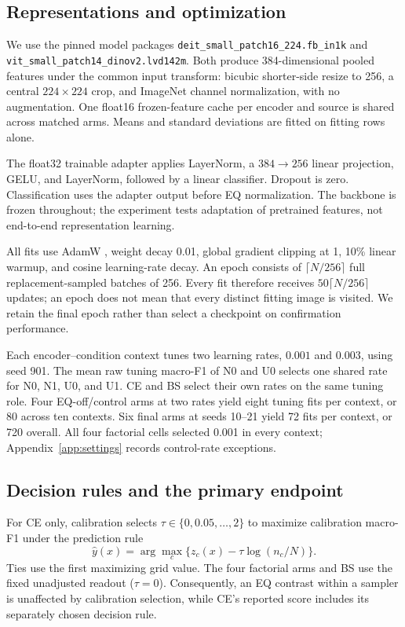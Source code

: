\documentclass[conference]{IEEEtran}
\begin{document}
\subsection{Representations and optimization}
We use the pinned model packages \nolinkurl{deit_small_patch16_224.fb_in1k} and \nolinkurl{vit_small_patch14_dinov2.lvd142m}. Both produce 384-dimensional pooled features under the common input transform: bicubic shorter-side resize to 256, a central $224\times224$ crop, and ImageNet channel normalization, with no augmentation. One float16 frozen-feature cache per encoder and source is shared across matched arms. Means and standard deviations are fitted on fitting rows alone.

The float32 trainable adapter applies LayerNorm, a $384\rightarrow256$ linear projection, GELU, and LayerNorm, followed by a linear classifier. Dropout is zero. Classification uses the adapter output before EQ normalization. The backbone is frozen throughout; the experiment tests adaptation of pretrained features, not end-to-end representation learning.

All fits use AdamW \cite{loshchilov2019}, weight decay 0.01, global gradient clipping at 1, 10\% linear warmup, and cosine learning-rate decay. An epoch consists of $\lceil N/256\rceil$ full replacement-sampled batches of 256. Every fit therefore receives $50\lceil N/256\rceil$ updates; an epoch does not mean that every distinct fitting image is visited. We retain the final epoch rather than select a checkpoint on confirmation performance.

Each encoder--condition context tunes two learning rates, $0.001$ and $0.003$, using seed 901. The mean raw tuning macro-F1 of N0 and U0 selects one shared rate for N0, N1, U0, and U1. CE and BS select their own rates on the same tuning role. Four EQ-off/control arms at two rates yield eight tuning fits per context, or 80 across ten contexts. Six final arms at seeds 10--21 yield 72 fits per context, or 720 overall. All four factorial cells selected 0.001 in every context; Appendix~\ref{app:settings} records control-rate exceptions.

\subsection{Decision rules and the primary endpoint}
For CE only, calibration selects $\tau\in\{0,0.05,\ldots,2\}$ to maximize calibration macro-F1 under the prediction rule
\begin{equation}
\hat y(x)=\arg\max_c\{z_c(x)-\tau\log(n_c/N)\}.
\end{equation}
Ties use the first maximizing grid value. The four factorial arms and BS use the fixed unadjusted readout ($\tau=0$). Consequently, an EQ contrast within a sampler is unaffected by calibration selection, while CE's reported score includes its separately chosen decision rule.
\end{document}
